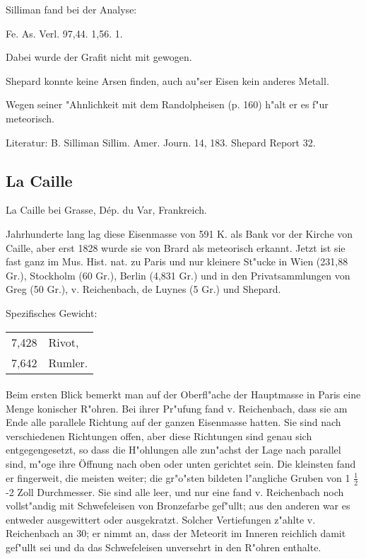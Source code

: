 \documentclass[a4paper, 11pt, oneside]{article}
\begin{document}
Silliman fand bei der Analyse:

Fe. As. Verl.  
97,44. 1,56. 1.

Dabei wurde der Grafit nicht mit gewogen.

Shepard konnte keine Arsen finden, auch au"ser Eisen kein anderes Metall.

Wegen seiner "Ahnlichkeit mit dem Randolpheisen (p. 160) h"alt er es f"ur meteorisch.

Literatur: B. Silliman Sillim. Amer. Journ. 14, 183. Shepard Report 32.

\subsection{La Caille}

La Caille bei Grasse, Dép. du Var, Frankreich.

Jahrhunderte lang lag diese Eisenmasse von 591 K. als Bank vor der Kirche von Caille, aber erst 1828 wurde sie von Brard als meteorisch erkannt. Jetzt ist sie fast ganz im Mus. Hist. nat. zu Paris und nur kleinere St"ucke in Wien (231,88 Gr.), Stockholm (60 Gr.), Berlin (4,831 Gr.) und in den Privatsammlungen von Greg (50 Gr.), v. Reichenbach, de Luynes (5 Gr.) und Shepard.

Spezifisches Gewicht:  
\begin{table}[!ht]
    \centering
    \begin{tabular}{l l}
        7,428 & Rivot,\\
        7,642 & Rumler.
    \end{tabular}
\end{table}
\paragraph{}
Beim ersten Blick bemerkt man auf der Oberfl"ache der Hauptmasse in Paris eine Menge konischer R"ohren. Bei ihrer Pr"ufung fand v. Reichenbach, dass sie am Ende alle parallele Richtung auf der ganzen Eisenmasse hatten. Sie sind nach verschiedenen Richtungen offen, aber diese Richtungen sind genau sich entgegengesetzt, so dass die H"ohlungen alle zun"achst der Lage nach parallel sind, m"oge ihre Öffnung nach oben oder unten gerichtet sein. Die kleinsten fand er fingerweit, die meisten weiter; die gr"o"sten bildeten l"angliche Gruben von 1 $\frac{1}{2}$-2 Zoll Durchmesser. Sie sind alle leer, und nur eine fand v. Reichenbach noch vollst"andig mit Schwefeleisen von Bronzefarbe gef"ullt; aus den anderen war es entweder ausgewittert oder ausgekratzt. Solcher Vertiefungen z"ahlte v. Reichenbach an 30; er nimmt an, dass der Meteorit im Inneren reichlich damit gef"ullt sei und da das Schwefeleisen unversehrt in den R"ohren enthalte.
\end{document}
